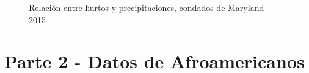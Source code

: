 \documentclass[11pt,a4paper]{article}
\begin{document}
\begin{figure}[!h]
    \centering
    \caption{Relación entre hurtos y precipitaciones, condados de Maryland - 2015}
    \label{fig:my_label}
\end{figure}


\clearpage
\section*{Parte 2 - Datos de Afroamericanos}
\end{document}
